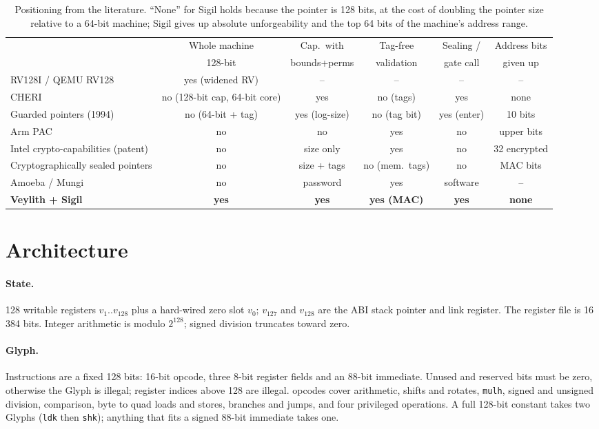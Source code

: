 \documentclass[10pt,a4paper]{article}
\begin{document}
\begin{table}[h]\centering\small
\begin{tabular}{@{}lccccc@{}}\toprule
& Whole machine & Cap.\ with & Tag-free & Sealing / & Address bits\\
& 128-bit & bounds+perms & validation & gate call & given up\\\midrule
RV128I / QEMU RV128 & yes (widened RV) & -- & -- & -- & --\\
CHERI & no (128-bit cap, 64-bit core) & yes & no (tags) & yes & none\\
Guarded pointers (1994) & no (64-bit + tag) & yes (log-size) & no (tag bit) & yes (enter) & 10 bits\\
Arm PAC & no & no & yes & no & upper bits\\
Intel crypto-capabilities (patent) & no & size only & yes & no & 32 encrypted\\
Cryptographically sealed pointers & no & size + tags & no (mem.\ tags) & no & MAC bits\\
Amoeba / Mungi & no & password & yes & software & --\\
\textbf{Veylith + Sigil} & \textbf{yes} & \textbf{yes} & \textbf{yes (MAC)} & \textbf{yes} & \textbf{none}\\\bottomrule
\end{tabular}\caption{Positioning from the literature. ``None'' for Sigil holds because the pointer is 128 bits, at the cost of doubling the pointer size relative to a 64-bit machine; Sigil gives up absolute unforgeability and the top 64 bits of the machine's address range.}\label{tab:prior}
\end{table}

\section{Architecture}
\paragraph{State.} 128 writable registers $v_1..v_{128}$ plus a hard-wired zero slot $v_0$; $v_{127}$ and $v_{128}$ are the ABI stack pointer and link register. The register file is 16\,384 bits. Integer arithmetic is modulo $2^{128}$; signed division truncates toward zero.

\paragraph{Glyph.} Instructions are a fixed 128 bits: 16-bit opcode, three 8-bit register fields and an 88-bit immediate. Unused and reserved bits must be zero, otherwise the Glyph is illegal; register indices above 128 are illegal. \Opcodes{} opcodes cover arithmetic, shifts and rotates, \texttt{mulh}, signed and unsigned division, comparison, byte to quad loads and stores, branches and jumps, and four privileged operations. A full 128-bit constant takes two Glyphs (\texttt{ldk} then \texttt{shk}); anything that fits a signed 88-bit immediate takes one.
\end{document}
